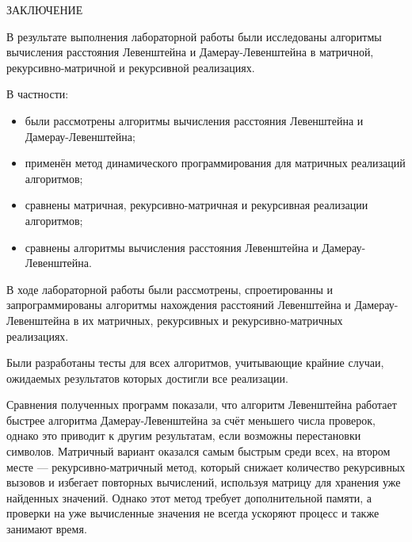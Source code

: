 \begin{center}
    \MakeUppercase{\large Заключение}
\end{center}

В результате выполнения лабораторной работы были исследованы алгоритмы вычисления расстояния Левенштейна и Дамерау-Левенштейна в матричной, рекурсивно-матричной и рекурсивной реализациях.

\vspace{0.25cm}
В частности:

\begin{itemize}

\item были рассмотрены алгоритмы вычисления расстояния Левенштейна и Дамерау-Левенштейна;

\item применён метод динамического программирования для матричных реализаций алгоритмов;

\item сравнены матричная, рекурсивно-матричная и рекурсивная реализации алгоритмов;

\item сравнены алгоритмы вычисления расстояния Левенштейна и Дамерау-Левенштейна.

\end{itemize}

В ходе лабораторной работы были рассмотрены, спроетированны и запрограммированы алгоритмы нахождения расстояний Левенштейна и Дамерау-Левенштейна в их матричных, рекурсивных и рекурсивно-матричных реализациях.

Были разработаны тесты для всех алгоритмов, учитывающие крайние случаи, ожидаемых результатов которых достигли все реализации.

Сравнения полученных программ показали, что алгоритм Левенштейна работает быстрее алгоритма Дамерау-Левенштейна за счёт меньшего числа проверок, однако это приводит к другим результатам, если возможны перестановки символов. Матричный вариант оказался самым быстрым среди всех, на втором месте — рекурсивно-матричный метод, который снижает количество рекурсивных вызовов и избегает повторных вычислений, используя матрицу для хранения уже найденных значений. Однако этот метод требует дополнительной памяти, а проверки на уже вычисленные значения не всегда ускоряют процесс и также занимают время.

\newpage